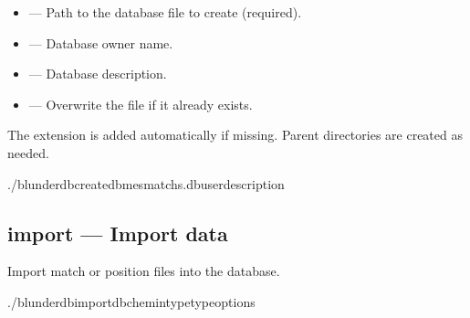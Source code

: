 \documentclass[letterpaper,10pt,english]{sphinxmanual}
\begin{document}
\sphinxAtStartPar
{}
\begin{itemize}
\item {} 
\sphinxAtStartPar
{} — Path to the database file to create (required).

\item {} 
\sphinxAtStartPar
{} — Database owner name.

\item {} 
\sphinxAtStartPar
{} — Database description.

\item {} 
\sphinxAtStartPar
{} — Overwrite the file if it already exists.

\end{itemize}

\sphinxAtStartPar
The  extension is added automatically if missing. Parent directories are created as needed.

\sphinxAtStartPar
{}

\begin{sphinxVerbatim}[commandchars=\\\{\}]
./blunderdbcreate\PYGZhy{}\PYGZhy{}dbmes\PYGZus{}matchs.db\PYGZhy{}\PYGZhy{}user\PYGZhy{}\PYGZhy{}description
\end{sphinxVerbatim}


\subsection{import — Import data}
\label{\detokenize{cli:import-importer-des-donnees}}
\sphinxAtStartPar
Import match or position files into the database.

\begin{sphinxVerbatim}[commandchars=\\\{\}]
./blunderdbimport\PYGZhy{}\PYGZhy{}db\PYGZlt{}chemin\PYGZgt{}\PYGZhy{}\PYGZhy{}type\PYGZlt{}type\PYGZgt{}\PYG{o}{[}options\PYG{o}{]}
\end{sphinxVerbatim}
\end{document}
